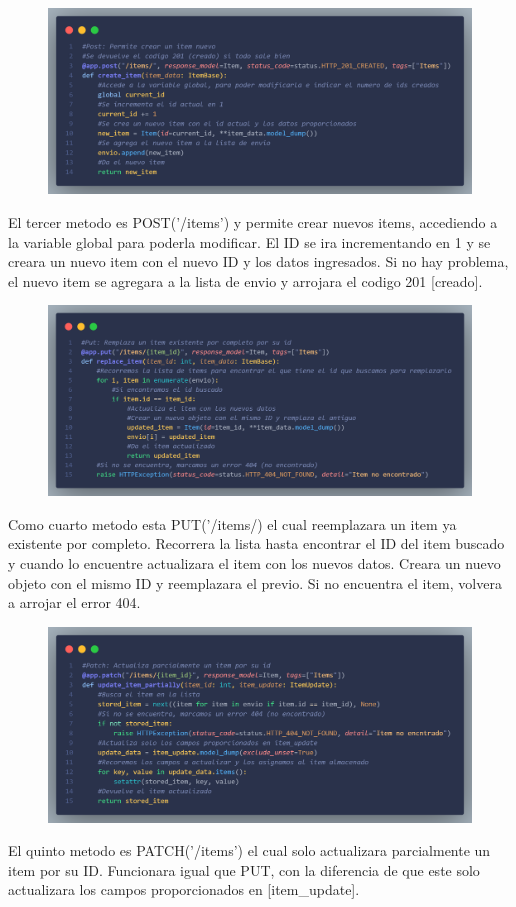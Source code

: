 \documentclass[12pt]{article}
\begin{document}
\begin{figure}[H]
    \centering
    \includegraphics[width=1\textwidth]{Imagenes/Captura7_post.png}
\end{figure}
El tercer metodo es POST('/items') y permite crear nuevos items, accediendo a la variable global para poderla modificar.
El ID se ira incrementando en 1 y se creara un nuevo item con el nuevo ID y los datos ingresados.
Si no hay problema, el nuevo item se agregara a la lista de envio y arrojara el codigo 201 [creado].

\begin{figure}[H]
    \centering
    \includegraphics[width=1\textwidth]{Imagenes/Captura8_put.png}
\end{figure}
Como cuarto metodo esta PUT('/items/) el cual reemplazara un item ya existente por completo.
Recorrera la lista hasta encontrar el ID del item buscado y cuando lo encuentre actualizara el item con los nuevos datos.
Creara un nuevo objeto con el mismo ID y reemplazara el previo.
Si no encuentra el item, volvera a arrojar el error 404.

\begin{figure}[H]
    \centering
    \includegraphics[width=1\textwidth]{Imagenes/Captura9_patch.png}
\end{figure}
El quinto metodo es PATCH('/items') el cual solo actualizara parcialmente un item por su ID.
Funcionara igual que PUT, con la diferencia de que este solo actualizara los campos proporcionados en [item\_update].
\end{document}
